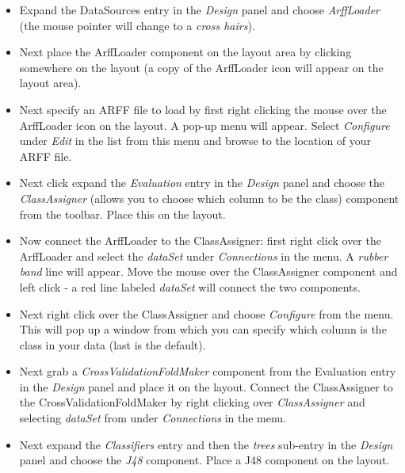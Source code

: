 \begin{itemize}
	\item Expand the DataSources entry in the \textit{Design} panel and
          choose \textit{ArffLoader} (the mouse pointer will change to
          a \textit{cross hairs}).

	\item Next place the ArffLoader component on the layout area by clicking
	somewhere on the layout (a copy of the ArffLoader icon will appear on
	the layout area).

	\item Next specify an ARFF file to load by first right clicking the mouse
	over the ArffLoader icon on the layout. A pop-up menu will
	appear. Select \textit{Configure} under \textit{Edit} in the list from this menu and
	browse to the location of your ARFF file.

	\item Next click expand the \textit{Evaluation} entry in the
          \textit{Design} panel and choose the \textit{ClassAssigner}
          (allows you to choose which column to be the class)
          component from the toolbar. Place this on the layout.

	\item Now connect the ArffLoader to the ClassAssigner: first right click
	over the ArffLoader and select the \textit{dataSet} under \textit{Connections} in
	the menu. A \textit{rubber band} line will appear. Move the mouse over the
	ClassAssigner component and left click - a red line labeled \textit{dataSet}
	will connect the two components.

	\item Next right click over the ClassAssigner and choose \textit{Configure} from
	the menu. This will pop up a window from which you can specify which
	column is the class in your data (last is the default).

	\item Next grab a \textit{CrossValidationFoldMaker} component
          from the Evaluation entry in the \textit{Design} panel and
          place it on the layout. Connect the ClassAssigner to the
          CrossValidationFoldMaker by right clicking over
          \textit{ClassAssigner} and selecting \textit{dataSet} from
          under \textit{Connections} in the menu.

	\item Next expand the \textit{Classifiers} entry and then the
          \textit{trees} sub-entry in the \textit{Design} panel and
          choose the \textit{J48} component. Place a J48 component on
          the layout.


\end{itemize}
